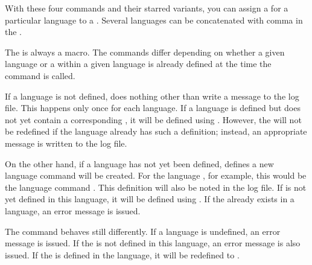 \begin{Declaration}
\end{Declaration}
With these four commands and their starred variants, you can assign a
 for a particular language to a . Several
languages can be concatenated with comma in the .

The  is always a macro. The commands differ depending on whether a
given language or a  within a given language is already defined at
the time the command is called.

If a language is not defined,  does nothing other
than write a message to the log file. This happens only once for each
language. If a language is defined but does not yet contain a corresponding
, it will be defined using . However, the
 will not be redefined if the language already has such a
definition; instead, an appropriate message is written to the log file.

On the other hand, if a language has not yet been defined,
 defines a new language command will be created. For the
language , for example, this would be the language command
. This definition will also be noted in the log file.
If  is not yet defined in this language, it will be defined using
. If the  already exists in a language, an error
message is issued.

The  command behaves still differently. If a language
is undefined, an error message is issued. If the  is not defined
in this language, an error message is also issued. If the  is
defined in the language, it will be redefined to .

